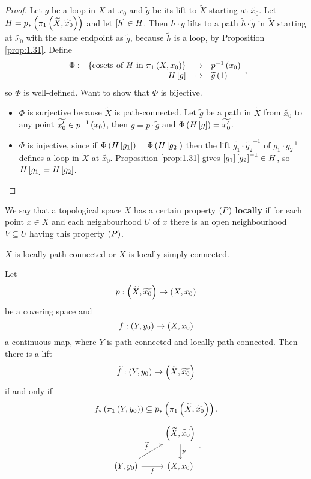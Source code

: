 \begin{proof}
Let $ g $ be a loop in $ X $ at $ x_0 $ and $ \widetilde{g} $ be its lift to $ \widetilde{X} $ starting at $ \widetilde{x_0} $. Let $ H = p_*\rb{\pi_1\rb{\widetilde{X}, \widetilde{x_0}}} $ and let $ \sb{h} \in H $. Then $ h \cdot g $ lifts to a path $ \widetilde{h} \cdot \widetilde{g} $ in $ \widetilde{X} $ starting at $ \widetilde{x_0} $ with the same endpoint as $ \widetilde{g} $, because $ \widetilde{h} $ is a loop, by Proposition \ref{prop:1.31}. Define
$$ \function[\Phi]{\cb{\text{cosets of} \ H \ \text{in} \ \pi_1\rb{X, x_0}}}{p^{-1}\rb{x_0}}{H\sb{g}}{\widetilde{g}\rb{1}}, $$
so $ \Phi $ is well-defined. Want to show that $ \Phi $ is bijective.
\begin{itemize}
\item $ \Phi $ is surjective because $ \widetilde{X} $ is path-connected. Let $ \widetilde{g} $ be a path in $ \widetilde{X} $ from $ \widetilde{x_0} $ to any point $ \widetilde{x_0'} \in p^{-1}\rb{x_0} $, then $ g = p \cdot \widetilde{g} $ and $ \Phi\rb{H\sb{g}} = \widetilde{x_0'} $.
\item $ \Phi $ is injective, since if $ \Phi\rb{H\sb{g_1}} = \Phi\rb{H\sb{g_2}} $ then the lift $ \widetilde{g_1} \cdot \widetilde{g_2}^{-1} $ of $ g_1 \cdot g_2^{-1} $ defines a loop in $ \widetilde{X} $ at $ \widetilde{x_0} $. Proposition \ref{prop:1.31} gives $ \sb{g_1}\sb{g_2}^{-1} \in H $, so $ H\sb{g_1} = H\sb{g_2} $.
\end{itemize}
\end{proof}

We say that a topological space $ X $ has a certain property $ \rb{P} $ \textbf{locally} if for each point $ x \in X $ and each neighbourhood $ U $ of $ x $ there is an open neighbourhood $ V \subseteq U $ having this property $ \rb{P} $.

\begin{example*}
$ X $ is locally path-connected or $ X $ is locally simply-connected.
\end{example*}

\begin{proposition}
\label{prop:1.33}
Let
$$ p : \rb{\widetilde{X}, \widetilde{x_0}} \to \rb{X, x_0} $$
be a covering space and
$$ f : \rb{Y, y_0} \to \rb{X, x_0} $$
a continuous map, where $ Y $ is path-connected and locally path-connected. Then there is a lift
$$ \widetilde{f} : \rb{Y, y_0} \to \rb{\widetilde{X}, \widetilde{x_0}} $$
if and only if
$$ f_*\rb{\pi_1\rb{Y, y_0}} \subseteq p_*\rb{\pi_1\rb{\widetilde{X}, \widetilde{x_0}}}. $$
$$
\begin{tikzcd}
& \rb{\widetilde{X}, \widetilde{x_0}} \arrow{d}{p} \\
\rb{Y, y_0} \arrow{ur}{\widetilde{f}} \arrow[swap]{r}{f} & \rb{X, x_0}
\end{tikzcd}.
$$
\end{proposition}

